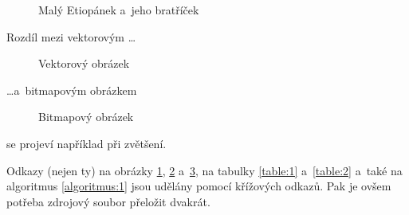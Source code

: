 \documentclass[11pt,a4paper,titlepage]{article}
\begin{document}
\begin{figure}[h]
\begin{center}
	\caption{Malý Etiopánek a~jeho bratříček}
	\label{picture:1}
	\end{center}
\end{figure}
\newpage
Rozdíl mezi vektorovým \dots
\begin{figure}[h]
	\begin{center}
		\caption{Vektorový obrázek}
		\label{picture:2}
	\end{center}
\end{figure}

\noindent\dots a~bitmapovým obrázkem

\begin{figure}[h]
	\begin{center}
		\caption{Bitmapový obrázek}
		\label{picture:3}
	\end{center}
\end{figure}
\noindent se projeví například při zvětšení.

Odkazy (nejen ty) na obrázky \ref{picture:1}, \ref{picture:2} a~\ref{picture:3}, na tabulky \ref{table:1} a~\ref{table:2} a~také na
algoritmus \ref{algoritmus:1} jsou udělány pomocí křížových odkazů. Pak je ovšem potřeba zdrojový soubor přeložit dvakrát.
\end{document}
